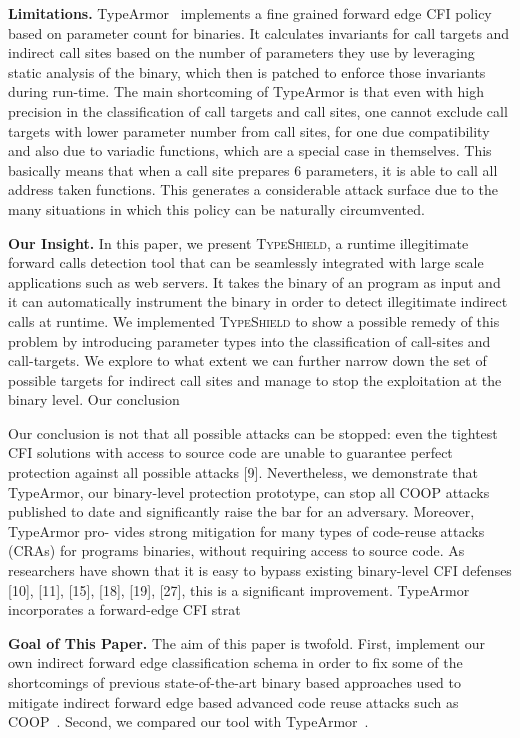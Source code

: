 \textbf{Limitations.} TypeArmor~\cite{veen:typearmor} implements a fine grained forward edge CFI 
policy based on parameter count for binaries. It calculates invariants for call targets and indirect call sites based on
the number of parameters they use by leveraging static analysis of the binary, which then is
patched to enforce those invariants during run-time. The main shortcoming of TypeArmor is that
even with high precision in the classification of 
call targets and call sites, one cannot exclude call targets with lower parameter number from 
call sites, for one due compatibility and also due to variadic functions, which are a special
case in themselves. This basically means that when a call site prepares 6 parameters, it is 
able to call all address taken functions. This generates a considerable attack surface due to the many
situations in which this policy can be naturally circumvented.

\textbf{Our Insight.} In this paper, we present \textsc{TypeShield}, a runtime illegitimate forward 
calls detection tool that can be seamlessly integrated with large scale applications such as web servers.
It takes the binary of an program as input and it can automatically instrument the binary in order
to detect illegitimate indirect calls at runtime. 
We implemented \textsc{TypeShield} to show a possible remedy of this problem by introducing
parameter types into the classification of call-sites and call-targets. We explore to
what extent we can further narrow down the set of possible targets for indirect call sites
and manage to stop the exploitation at the binary level.
Our conclusion



Our conclusion is not that all possible attacks
can be stopped: even the tightest CFI solutions with access
to source code are unable to guarantee perfect protection
against all possible attacks [9]. Nevertheless, we demonstrate
that TypeArmor, our binary-level protection prototype, can
stop all COOP attacks published to date and significantly
raise the bar for an adversary. Moreover, TypeArmor pro-
vides strong mitigation for many types of code-reuse attacks
(CRAs) for programs binaries, without requiring access to
source code. As researchers have shown that it is easy to
bypass existing binary-level CFI defenses [10], [11], [15],
[18], [19], [27], this is a significant improvement.
TypeArmor incorporates a forward-edge CFI strat 





\textbf{Goal of This Paper.} The aim of this paper is twofold. First, implement our own indirect forward edge 
classification schema in order to fix some of the shortcomings of previous state-of-the-art binary based approaches
used to mitigate indirect forward edge based advanced code reuse attacks such as COOP~\cite{schuster:coop}.
Second, we compared our tool with TypeArmor~\cite{veen:typearmor}.

